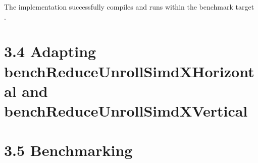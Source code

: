 The implementation successfully compiles and runs within the benchmark target \\
.

\pagebreak

\section*{3.4 Adapting benchReduceUnrollSimdXHorizontal and benchReduceUnrollSimdXVertical}

\pagebreak

\section*{3.5 Benchmarking}


